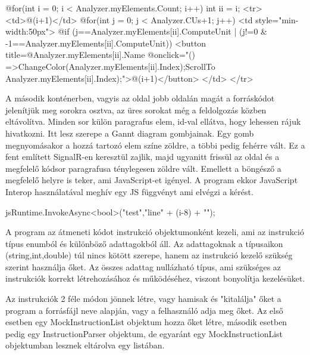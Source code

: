 \begin{cpp}
@for(int i = 0; i < Analyzer.myElements.Count; i++)
 {
   int ii = i;
   <tr>
      <td>@(i+1)</td>
      @for(int j = 0; j < Analyzer.CUs+1; j++)
        {
          <td style="min-width:50px">
          @if (j==Analyzer.myElements[ii].ComputeUnit | (j!=0 &
               -1==Analyzer.myElements[ii].ComputeUnit))
             {
                <button title=@Analyzer.myElements[ii].Name @onclick="()
                =>{ChangeColor(Analyzer.myElements[ii].Index);ScrollTo
                Analyzer.myElements[ii].Index);}">@(i+1)</button>
             }
          </td>
        }
   </tr>
 }
\end{cpp}


A második konténerben, vagyis az oldal jobb oldalán magát a forráskódot jelenítjük meg sorokra osztva, az üres sorokat még a feldolgozás közben eltávolítva. Minden sor külön paragrafus elem, id-val ellátva, hogy lehessen rájuk hivatkozni. Itt lesz szerepe a Gannt diagram gombjainak. Egy gomb megnyomásakor a hozzá tartozó elem színe zöldre, a többi pedig fehérre vált. Ez a fent említett SignalR-en keresztül zajlik, majd ugyanitt frissül az oldal és a megfelelő kódsor paragrafusa ténylegesen zöldre vált. Emellett a böngésző a megfelelő helyre is teker, ami JavaScript-et igényel. A program ekkor JavaScript Interop használatával meghív egy JS függvényt ami elvégzi a kérést.

\begin{cpp}
jsRuntime.InvokeAsync<bool>("test","line{" + (i-8) + "}");
\end{cpp}

A program az átmeneti kódot instrukció objektumonként kezeli, ami az instrukció típus enumból és különböző adattagokból áll. Az adattagoknak a típusaikon (string,int,double) túl nincs kötött szerepe, hanem az instrukció kezelő szükség szerint használja őket. Az összes adattag nullázható típus, ami szükséges az instrukciók korrekt létrehozásához és működéséhez, viszont bonyolítja kezelésüket.

Az instrukciók 2 féle módon jönnek létre, vagy hamisak és "kitalálja" őket a program a forrásfájl neve alapján, vagy a felhasználó adja meg őket. Az első esetben egy MockInstructionList objektum hozza őket létre, második esetben pedig egy InstructionParser objektum, de egyaránt egy MockInstructionList objektumban lesznek eltárolva egy listában.

